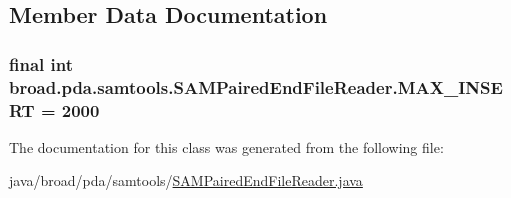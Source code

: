 \subsection{Member Data Documentation}
\hypertarget{classbroad_1_1pda_1_1samtools_1_1_s_a_m_paired_end_file_reader_abd20642531b0de318293361369dc068c}{
\subsubsection[{M\+A\+X\+\_\+\+I\+N\+S\+E\+R\+T}]{\setlength{\rightskip}{0pt plus 5cm}final int broad.\+pda.\+samtools.\+S\+A\+M\+Paired\+End\+File\+Reader.\+M\+A\+X\+\_\+\+I\+N\+S\+E\+R\+T = 2000\hspace{0.3cm}{\ttfamily [static]}}}\label{classbroad_1_1pda_1_1samtools_1_1_s_a_m_paired_end_file_reader_abd20642531b0de318293361369dc068c}


The documentation for this class was generated from the following file\+:\begin{DoxyCompactItemize}
\item 
java/broad/pda/samtools/\hyperlink{_s_a_m_paired_end_file_reader_8java}{S\+A\+M\+Paired\+End\+File\+Reader.\+java}\end{DoxyCompactItemize}
